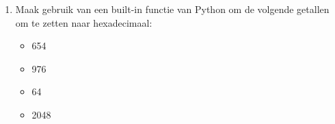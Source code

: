 \begin{enumerate}
\item Maak gebruik van een built-in functie van Python om de volgende getallen om te zetten naar hexadecimaal:
	\begin{itemize}
	\item 654
	\item 976
	\item 64
	\item 2048
	\end{itemize}
\end{enumerate}

